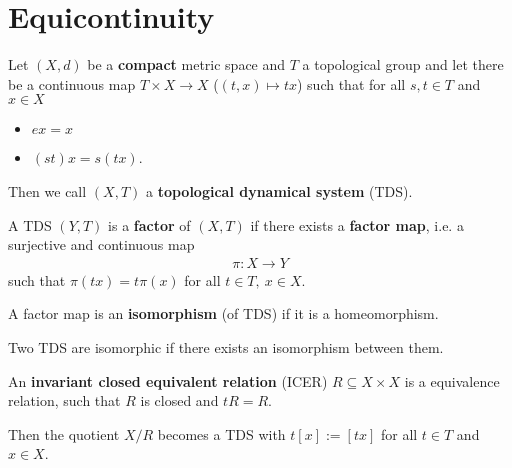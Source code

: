 \section{Equicontinuity}

\begin{frame}
	\begin{definition}
		Let $(X, d)$ be a \textbf{compact} metric space and $T$ a topological group and let there be a continuous map $T \times X \to X$ ($(t, x) \mapsto tx$) such that for all $s, t \in T$ and $x \in X$
		\begin{itemize}
			\item $ex = x$
			\item $(st)x = s(tx)$.
		\end{itemize}
		Then we call $(X, T)$ a \textbf{topological dynamical system} (TDS).
	\end{definition}
	\begin{overlayarea}{\textwidth}{3.5cm}
	\begin{minipage}{\textwidth}
	\end{minipage}
	\end{overlayarea}
\end{frame}

\begin{frame}
	\begin{definition}
		A TDS $(Y, T)$ is a \textbf{factor} of $(X, T)$ if there exists a \textbf{factor map}, i.e. a surjective and continuous map
		\begin{align*}
			\pi: X \to Y
		\end{align*}
		such that $\pi(tx) = t\pi(x)$ for all $t \in T,\ x \in X$.\pause
		
		A factor map is an \textbf{isomorphism} (of TDS) if it is a homeomorphism.
		
		Two TDS are isomorphic if there exists an isomorphism between them.\pause
	\end{definition}
	\begin{definition}
		An \textbf{invariant closed equivalent relation} (ICER) $R \subseteq X \times X$ is a equivalence relation, such that $R$ is closed and $tR = R$.\pause
		
		Then the quotient $X/R$ becomes a TDS with $t[x] := [tx]$ for all $t \in T$ and $x \in X$.
	\end{definition}
\end{frame}


